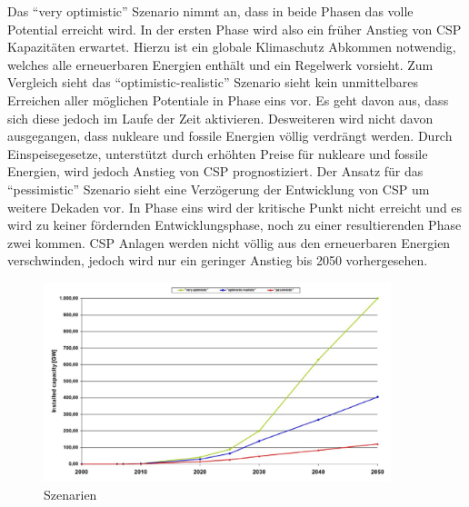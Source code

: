 Das "`very optimistic"' Szenario nimmt an, dass in beide Phasen das volle Potential erreicht wird. In der ersten Phase wird also ein früher Anstieg von CSP Kapazitäten erwartet. Hierzu ist ein globale Klimaschutz Abkommen notwendig, welches alle erneuerbaren Energien enthält und ein Regelwerk vorsieht.
Zum Vergleich sieht das "`optimistic-realistic"' Szenario sieht kein unmittelbares Erreichen aller möglichen Potentiale in Phase eins vor. Es geht davon aus, dass sich diese jedoch im Laufe der Zeit aktivieren. Desweiteren wird nicht davon ausgegangen, dass nukleare und fossile Energien völlig verdrängt werden. Durch Einspeisegesetze, unterstützt durch erhöhten Preise für nukleare und fossile Energien, wird jedoch Anstieg von CSP prognostiziert.
Der Ansatz für das "`pessimistic"' Szenario sieht eine Verzögerung der Entwicklung von CSP um weitere Dekaden vor. In Phase eins wird der kritische Punkt nicht erreicht und es wird zu keiner fördernden Entwicklungsphase, noch zu einer resultierenden Phase zwei kommen. CSP Anlagen werden nicht völlig aus den erneuerbaren Energien verschwinden, jedoch wird nur ein geringer Anstieg bis 2050 vorhergesehen.


\begin{figure}[H]
	\centering
	\includegraphics[width=0.9\textwidth,trim=1 1 1 1,clip]{szenarien.png}
	\caption{Szenarien}
	\label{fig:scenes}
\end{figure}


